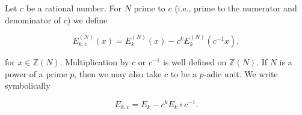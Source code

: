 Let $c$ be a rational number. For $N$ prime to $c$ (i.e., prime to the numerator and denominator of $c$) we define

$$E_{k,c}^{(N)}(x) = E_k^{(N)}(x) - c^k E_k^{(N)}(c^{-1}x),$$

for $x \in \mathbb{Z}(N)$. Multiplication by $c$ or $c^{-1}$ is well defined on $\mathbb{Z}(N)$. If $N$ is a power of a prime $p$, then we may also take $c$ to be a $p$-adic unit. We write symbolically

$$E_{k,c} = E_k - c^k E_k \circ c^{-1}.$$
